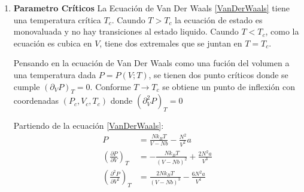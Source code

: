 \documentclass[12pt,letterpaper]{article}
\newcommand{\pd}[3] {\left(\frac{\partial #1}{\partial #2}\right)_{#3}}
\newcommand{\pdd}[3] {\left(\frac{\partial^2 #1}{\partial {#2}^2}\right)_{#3}}
\begin{document}
\begin{enumerate}
Utilizando \eqref{rRed}-\eqref{ConsRed} en \eqref{PressHS} obtenemos:
\begin{align}
\frac{p^*_{hs}}{\beta\sigma^3} &= \frac{n^*}{\beta\sigma^3}\left[ 1 +\frac{2}{3}\pi\sigma^3\frac{n^*}{\sigma^3} g_{hs}(1^+) \right] \nonumber \\
p^*_{hs} &= n^* \left[ 1 +\frac{2}{3}\pi n^* g_{hs}(1^+) \right] \nonumber \\
p^*_{hs} &= n^* \left[ 1 + n^*b^*\right] 
\intertext{Donde:}
b^* &= \frac{2}{3}\pi g_{hs}(1^+)
\end{align}
Ahora en \eqref{Press} obtenemos:

\begin{align}
\frac{p^*}{\beta\sigma^3} &= \frac{p^*_{hs}}{\beta\sigma^3} - \left(\frac{n^*}{\sigma^3}\right)^2 \left[ a(n^*) + \frac{n^*}{\sigma^3} \left( \frac{\partial a(n^*)}{\partial\frac{n^*}{\sigma^3}} \right)_{T^*} \right] \nonumber \\
p^* &= p^*_{hs}  - \frac{\beta {n^*}^2}{\sigma^3}\left[ a(n^*) + n^* \left( \frac{\partial a(n^*)}{\partial n^*} \right)_{T^*} \right] \nonumber \\
p^* &= p^*_{hs} - {n^*}^2\left[ \frac{\beta}{\sigma^3}a(n^*) + n^* \left(\frac{\partial\frac{\beta}{\sigma^3}a(n^*)}{\partial n^*}\right)_{T^*}\right] \nonumber \\
p^* &= p^*_{hs} - \left[ a^* + n^* \left(\frac{\partial a^*}{\partial n^*}\right)_{T^*} \right] {n^*}^2
\intertext{Donde:}
a^* &= \frac{\beta}{\sigma^3}a(n^*)
\end{align}

\item[III.] \textbf{Parametro Críticos} 
La Ecuación de Van Der Waals \eqref{VanDerWaals} tiene una temperatura crítica $T_c$.
Caundo $T>T_c$ la ecuación de estado es monovaluada y no hay transiciones al estado liquido. Caundo $T<T_c$, como la ecuación es cubica en $V$, tiene dos extremales que se juntan en $T=T_c$.

Pensando en la ecuación de Van Der Waals como una fución del volumen a una temperatura dada $P = P(V;T)$, se tienen dos punto críticos donde se cumple   $\left( \partial_V P \right)_T = 0 $. Conforme $T\rightarrow T_c$ se obtiene un punto de inflexión con coordenadas $(P_c, V_c, T_c)$ donde $\left( \partial^2_V P \right)_T=0$

Partiendo de la ecuación \eqref{VanDerWaals}:
\begin{align}
	P &= \frac{Nk_B T}{V-Nb} - \frac{N^2}{V^2}a	\label{PresVanDerWaals} \\
	\pd{P}{V}{T} &= -\frac{Nk_BT}{(V-Nb)^2} + \frac{2N^2a}{V^3} \\
	\pdd{P}{V}{T} &= \frac{2Nk_BT}{(V-Nb)^3} - \frac{6N^2a}{V^4}
\end{align}




\end{enumerate}



\pagebreak












\end{document}
